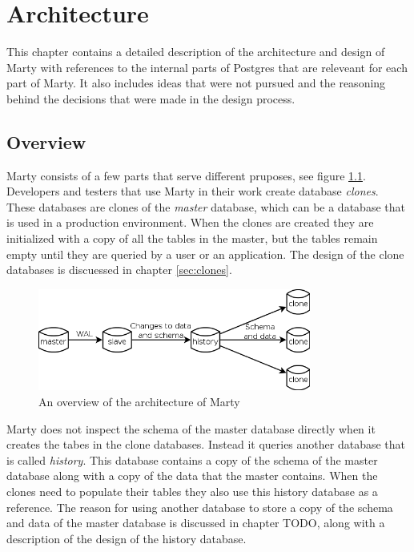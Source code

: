 \documentclass[a4paper,12pt,twoside,BCOR=10mm]{scrbook}
\begin{document}
\chapter{Architecture}
This chapter contains a detailed description of the architecture and design of Marty with references to the internal parts of Postgres that are releveant for each part of Marty. It also includes ideas that were not pursued and the reasoning behind the decisions that were made in the design process.

\section{Overview}
Marty consists of a few parts that serve different pruposes, see figure \ref{architecture-overview}. Developers and testers that use Marty in their work create database \textit{clones}. These databases are clones of the \textit{master} database, which can be a database that is used in a production environment. When the clones are created they are initialized with a copy of all the tables in the master, but the tables remain empty until they are queried by a user or an application. The design of the clone databases is discuessed in chapter \ref{sec:clones}.

\begin{figure}[h!]
  \centering
    \includegraphics[width=0.8\textwidth]{architecture}
  \caption{An overview of the architecture of Marty}
  \label{architecture-overview}
\end{figure}

Marty does not inspect the schema of the master database directly when it creates the tabes in the clone databases. Instead it queries another database that is called \textit{history}. This database contains a copy of the schema of the master database along with a copy of the data that the master contains. When the clones need to populate their tables they also use this history database as a reference. The reason for using another database to store a copy of the schema and data of the master database is discussed in chapter TODO, along with a description of the design of the history database.
\end{document}

